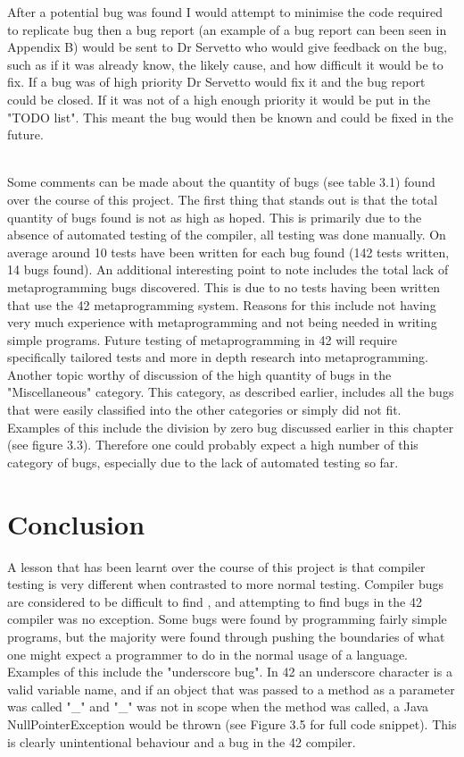 After a potential bug was found I would attempt to minimise the code required to replicate bug then a bug report (an example of a bug report can been seen in Appendix B) would be sent to Dr Servetto who would give feedback on the bug, such as if it was already know, the likely cause, and how difficult it would be to fix. If a bug was of high priority Dr Servetto would fix it and the bug report could be closed. If it was not of a high enough priority it would be put in the "TODO list". This meant the bug would then be known and could be fixed in the future. 



~\\
Some comments can be made about the quantity of bugs (see table 3.1) found over the course of this project. The first thing that stands out is that the total quantity of bugs found is not as high as hoped. This is primarily due to the absence of automated testing of the compiler, all testing was done manually. On average around 10 tests have been written for each bug found (142 tests written, 14 bugs found). An additional interesting point to note includes the total lack of metaprogramming bugs discovered. This is due to no tests having been written that use the 42 metaprogramming system. Reasons for this include not having very much experience with metaprogramming and not being needed in writing simple programs. Future testing of metaprogramming in 42 will require specifically tailored tests and more in depth research into metaprogramming. Another topic worthy of discussion of the high quantity of bugs in the "Miscellaneous" category. This category, as described earlier, includes all the bugs that were easily classified into the other categories or simply did not fit. Examples of this include the division by zero bug discussed earlier in this chapter (see figure 3.3). Therefore one could probably expect a high number of this category of bugs, especially due to the lack of automated testing so far.

\section{Conclusion}
A lesson that has been learnt over the course of this project is that compiler testing is very different when contrasted to more normal testing. Compiler bugs are considered to be difficult to find \cite{Leroy:2009}, and attempting to find bugs in the 42 compiler was no exception. Some bugs were found by programming fairly simple programs, but the majority were found through pushing the boundaries of what one might expect a programmer to do in the normal usage of a language. Examples of this include the "underscore bug". In 42 an underscore character is a valid variable name, and if an object that was passed to a method as a parameter was called  "\_" and "\_" was not in scope when the method was called, a Java NullPointerException would be thrown (see Figure 3.5 for full code snippet). This is clearly unintentional behaviour and a bug in the 42 compiler.

